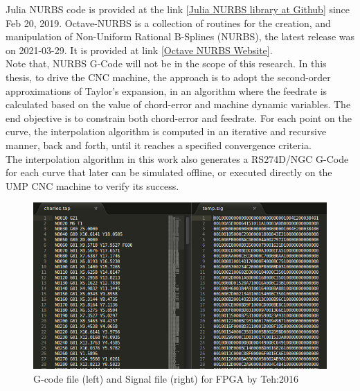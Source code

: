 Julia NURBS code is provided at the link [\href{https://github.com/eOnofri04/NURBS.jl}{Julia NURBS library at Github}] since Feb 20, 2019. Octave-NURBS is a collection of routines for the creation, and manipulation of Non-Uniform Rational B-Splines (NURBS), the latest release was on 2021-03-29. It is provided at link [\href{https://gnu-octave.github.io/packages/nurbs/}{Octave NURBS Website}]. \\

Note that, NURBS G-Code will not be in the scope of this research.  In this thesis, to drive the CNC machine, the approach is to adopt the second-order approximations of Taylor’s expansion, in an algorithm where the feedrate is calculated based on the value of chord-error and machine dynamic variables. The end objective is to constrain both chord-error and feedrate. For each point on the curve, the interpolation algorithm is computed in an iterative and recursive manner, back and forth, until it reaches a specified convergence criteria. \\

The interpolation algorithm in this work also generates a RS274D/NGC G-Code for each curve that later can be simulated offline, or executed directly on the UMP CNC machine to verify its success. 


\clearpage
\pagebreak
\begin{landscape}

\begin{figure}
	\caption{G-code file (left) and Signal file (right) for FPGA by Teh:2016}
	\label{Gcode-left-to-Nexys3-signal-file-right.jpg}
	\centering
	\includegraphics[width=1.62\textwidth]{Chap2/Images/Gcode-left-to-Nexys3-signal-file-right.jpg} 
\end{figure}

\end{landscape}